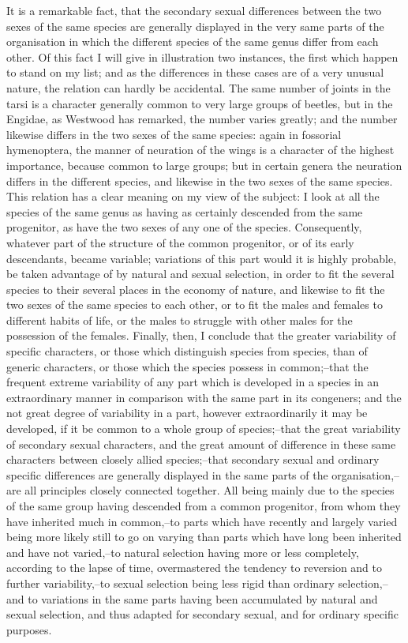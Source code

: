 It is a remarkable fact, that the secondary sexual differences between the two sexes of the same species are generally displayed in the very same parts of the organisation in which the different species of the same genus differ from each other. Of this fact I will give in illustration two instances, the first which happen to stand on my list; and as the differences in these cases are of a very unusual nature, the relation can hardly be accidental. The same number of joints in the tarsi is a character generally common to very large groups of beetles, but in the Engidae, as Westwood has remarked, the number varies greatly; and the number likewise differs in the two sexes of the same species: again in fossorial hymenoptera, the manner of neuration of the wings is a character of the highest importance, because common to large groups; but in certain genera the neuration differs in the different species, and likewise in the two sexes of the same species. This relation has a clear meaning on my view of the subject: I look at all the species of the same genus as having as certainly descended from the same progenitor, as have the two sexes of any one of the species. Consequently, whatever part of the structure of the common progenitor, or of its early descendants, became variable; variations of this part would it is highly probable, be taken advantage of by natural and sexual selection, in order to fit the several species to their several places in the economy of nature, and likewise to fit the two sexes of the same species to each other, or to fit the males and females to different habits of life, or the males to struggle with other males for the possession of the females.
Finally, then, I conclude that the greater variability of specific characters, or those which distinguish species from species, than of generic characters, or those which the species possess in common;--that the frequent extreme variability of any part which is developed in a species in an extraordinary manner in comparison with the same part in its congeners; and the not great degree of variability in a part, however extraordinarily it may be developed, if it be common to a whole group of species;--that the great variability of secondary sexual characters, and the great amount of difference in these same characters between closely allied species;--that secondary sexual and ordinary specific differences are generally displayed in the same parts of the organisation,--are all principles closely connected together. All being mainly due to the species of the same group having descended from a common progenitor, from whom they have inherited much in common,--to parts which have recently and largely varied being more likely still to go on varying than parts which have long been inherited and have not varied,--to natural selection having more or less completely, according to the lapse of time, overmastered the tendency to reversion and to further variability,--to sexual selection being less rigid than ordinary selection,--and to variations in the same parts having been accumulated by natural and sexual selection, and thus adapted for secondary sexual, and for ordinary specific purposes.

